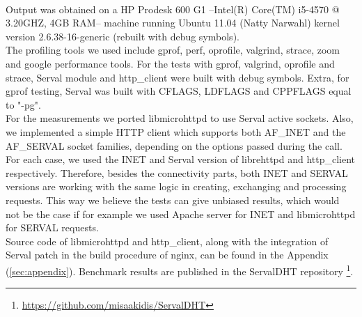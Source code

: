 \paragraph{} Output was obtained on a HP Prodesk 600 G1 --Intel(R) Core(TM) i5-4570 @ 3.20GHZ, 4GB RAM-- machine running Ubuntu 11.04 (Natty Narwahl) kernel version 2.6.38-16-generic (rebuilt with debug symbols).
\\ \indent The profiling tools we used include gprof, perf, oprofile, valgrind, strace, zoom and google performance tools.
For the tests with gprof, valgrind, oprofile and strace, Serval module and http\_client were built with debug symbols.
Extra, for gprof testing, Serval was built with CFLAGS, LDFLAGS and CPPFLAGS equal to "-pg".
\\ \indent For the measurements we ported libmicrohttpd to use Serval active sockets.
Also, we implemented a simple HTTP client which supports both AF\_INET and the AF\_SERVAL socket families, depending on the options passed during the call.
For each case, we used the INET and Serval version of librehttpd and http\_client respectively.
Therefore, besides the connectivity parts, both INET and SERVAL versions are working with the same logic in creating, exchanging and processing requests.
This way we believe the tests can give unbiased results, which would not be the case if for example we used Apache server for INET and libmicrohttpd for SERVAL requests.
\\ \indent Source code of libmicrohttpd and http\_client, along with the integration of Serval patch in the build procedure of nginx, can be found in the Appendix (\ref{sec:appendix}).
Benchmark results are published in the ServalDHT repository \footnote{\url{https://github.com/misaakidis/ServalDHT}}.

